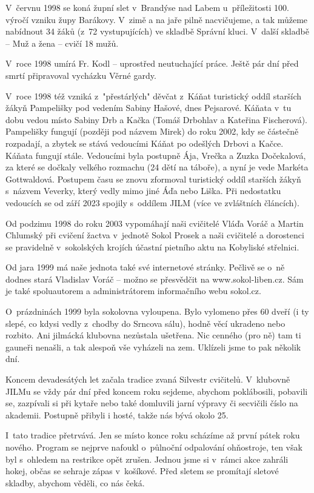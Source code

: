 \documentclass[a5paper, 11pt, twoside]{article}
\begin{document}
V~červnu 1998 se koná župní slet v~Brandýse nad Labem u~příležitosti
100. výročí vzniku župy Barákovy. V~zimě a na jaře pilně nacvičujeme, a
tak můžeme nabídnout 34 žáků (z~72 vystupujících) ve skladbě Správní
kluci. V~další skladbě -- Muž a žena -- cvičí 18 mužů.

V~roce 1998 umírá Fr. Kodl -- uprostřed neutuchající práce. Ještě pár
dní před smrtí připravoval vycházku Věrné gardy.

V~roce 1998 též vzniká z~"přestárlých" děvčat z~Káňat turistický oddíl
starších žákyň Pampelišky pod vedením Sabiny Hašové, dnes Pejsarové.
Káňata v~tu dobu vedou místo Sabiny Drb a Kačka (Tomáš Drbohlav a
Kateřina Fischerová). Pampelišky fungují (později pod názvem Mirek) do
roku 2002, kdy se částečně rozpadají, a zbytek se stává vedoucími Káňat
po odešlých Drbovi a Kačce. Káňata fungují stále. Vedoucími byla
postupně Ája, Vrečka a Zuzka Dočekalová, za které se dočkaly velkého
rozmachu (24 dětí na táboře), a nyní je vede Markéta Gottwaldová.
Postupem času se znovu zformoval turistický oddíl starších žákyň
s~názvem Veverky, který vedly mimo jiné Áďa nebo Liška. Při nedostatku
vedoucích se od září 2023 spojily s~oddílem JILM (více ve zvláštních
článcích).

Od podzimu 1998 do roku 2003 vypomáhají naši cvičitelé Vláďa Voráč a
Martin Chlumský při cvičení žactva v~jednotě Sokol Prosek a naši
cvičitelé a dorostenci se pravidelně v~sokolských krojích účastní
pietního aktu na Kobyliské střelnici.

Od jara 1999 má naše jednota také své internetové stránky. Pečlivě se
o~ně dodnes stará Vladislav Voráč -- možno se přesvědčit na www.sokol-liben.cz. Sám je také
spoluautorem a administrátorem informačního webu sokol.cz.

O~prázdninách 1999 byla sokolovna vyloupena. Bylo vylomeno přes 60 dveří
(i ty slepé, co kdysi vedly z~chodby do Srncova sálu), hodně věcí
ukradeno nebo rozbito. Ani jilmácká klubovna nezůstala ušetřena. Nic
cenného (pro ně) tam ti gauneři nenašli, a tak alespoň vše vyházeli na
zem. Uklízeli jsme to pak několik dní.

Koncem devadesátých let začala tradice zvaná Silvestr cvičitelů.
V~klubovně JILMu se vždy pár dní před koncem roku sejdeme, abychom
poklábosili, pobavili se, zazpívali si při kytaře nebo také domluvili
jarní výpravy či secvičili číslo na akademii. Postupně přibyli i hosté,
takže nás bývá okolo 25.

I~tato tradice přetrvává. Jen se místo konce roku scházíme až první
pátek roku nového. Program se nejprve nafoukl o~půlnoční odpalování
ohňostroje, ten však byl s~ohledem na restrikce opět zrušen. Jednou jsme
si v~rámci akce zahráli hokej, občas se sehraje zápas v~košíkové. Před
sletem se promítají sletové skladby, abychom věděli, co nás čeká.
\end{document}
